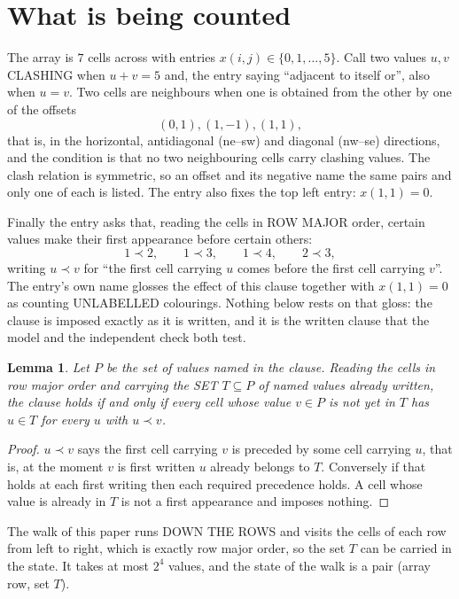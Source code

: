 \documentclass[11pt,a4paper]{article}
\theoremstyle{plain}
\newtheorem{lemma}[theorem]{Lemma}
\theoremstyle{definition}
\begin{document}
\section{What is being counted}

The array is $7$ cells across with entries $x(i,j)\in\{0,1,\dots,5\}$. Call two values $u,v$ CLASHING
when $u+v=5$ and, the entry saying ``adjacent to itself or'', also when $u=v$. Two cells are neighbours when one is obtained from the other by one of
the offsets
\[
(0,1), (1,-1), (1,1),
\]
that is, in the horizontal, antidiagonal (ne--sw) and diagonal (nw--se) directions, and the condition is that no two neighbouring cells carry
clashing values. The clash relation is symmetric, so an offset and its negative name the
same pairs and only one of each is listed. The entry also fixes the top left entry: $x(1,1)=0$.

Finally the entry asks that, reading the cells in ROW MAJOR order, certain values make their
first appearance before certain others:
\[
1\prec 2,\qquad 1\prec 3,\qquad 1\prec 4,\qquad 2\prec 3 ,
\]
writing $u\prec v$ for ``the first cell carrying $u$ comes before the first cell carrying
$v$''. The entry's own name glosses the effect of this clause together with $x(1,1)=0$ as
counting UNLABELLED colourings. Nothing below rests on that gloss: the clause is imposed
exactly as it is written, and it is the written clause that the model and the independent
check both test.

\begin{lemma}\label{lem:seen}
Let $P$ be the set of values named in the clause. Reading the cells in row major order and
carrying the SET $T\subseteq P$ of named values already written, the clause holds if and only
if every cell whose value $v\in P$ is not yet in $T$ has $u\in T$ for every $u$ with $u\prec v$.
\end{lemma}

\begin{proof}
$u\prec v$ says the first cell carrying $v$ is preceded by some cell carrying $u$, that is, at
the moment $v$ is first written $u$ already belongs to $T$. Conversely if that holds at each
first writing then each required precedence holds. A cell whose value is already in $T$ is not
a first appearance and imposes nothing.
\end{proof}

The walk of this paper runs DOWN THE ROWS and visits the cells of each row from left to right,
which is exactly row major order, so the set $T$ can be carried in the state. It takes at most
$2^{4}$ values, and the state of the walk is a pair (array row, set $T$).
\end{document}
